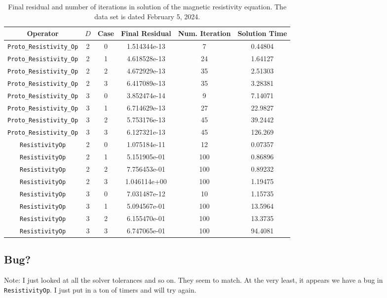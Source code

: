 \documentclass{article}
\begin{document}
\begin{small}
\begin{table}
\begin{center}
\begin{tabular}{|c|c|c|c|c||c|} \hline
 Operator                   & $D$ & Case & Final Residual &
 Num. Iteration & Solution Time\\
\hline
 \hline
 {\tt Proto\_Resistivity\_Op}     & 2   & 0    & 1.514344e-13   &        7 & 0.44804\\
 {\tt Proto\_Resistivity\_Op}     & 2   & 1    & 4.618528e-13   &       24 & 1.64127\\
 {\tt Proto\_Resistivity\_Op}     & 2   & 2    & 4.672929e-13   &       35 & 2.51303\\
 {\tt Proto\_Resistivity\_Op}     & 2   & 3    & 6.417089e-13   &       35 & 3.28381\\
 {\tt Proto\_Resistivity\_Op}     & 3   & 0    & 3.852474e-14   &        9 & 7.14071\\
 {\tt Proto\_Resistivity\_Op}     & 3   & 1    & 6.714629e-13   &       27 & 22.9827\\
 {\tt Proto\_Resistivity\_Op}     & 3   & 2    & 5.753176e-13   &       45 & 39.2442\\
 {\tt Proto\_Resistivity\_Op}     & 3   & 3    & 6.127321e-13   &       45 & 126.269\\
 \hline
 {\tt ResistivityOp}              & 2   & 0    & 1.075184e-11   &   12& 0.07357\\
 {\tt ResistivityOp}              & 2   & 1    & 5.151905e-01   &  100& 0.86896\\
 {\tt ResistivityOp}              & 2   & 2    & 7.756453e-01   &  100& 0.89232\\
 {\tt ResistivityOp}              & 2   & 3    & 1.046114e+00   &  100& 1.19475\\
 {\tt ResistivityOp}              & 3   & 0    & 7.031487e-12   &   10& 1.15735\\
 {\tt ResistivityOp}              & 3   & 1    & 5.094567e-01   &  100& 13.5964\\
 {\tt ResistivityOp}              & 3   & 2    & 6.155470e-01   &  100& 13.3735\\
 {\tt ResistivityOp}              & 3   & 3    & 6.747065e-01   &  100& 94.4081\\
\hline
\end{tabular}
\end{center}
\label{tab::resist}
\caption
    {
      Final residual and number of iterations in solution of the
      magnetic resistivity equation.
      The data set is dated February 5, 2024.
    }
\end{table}
\end{small}

\subsection{Bug?}
Note: I just looked at all the solver tolerances and so on.  They seem
to match.   At the very least, it appears we have  a bug in {\tt ResistivityOp}.
I just put in a ton of timers and will try again.
\end{document}
